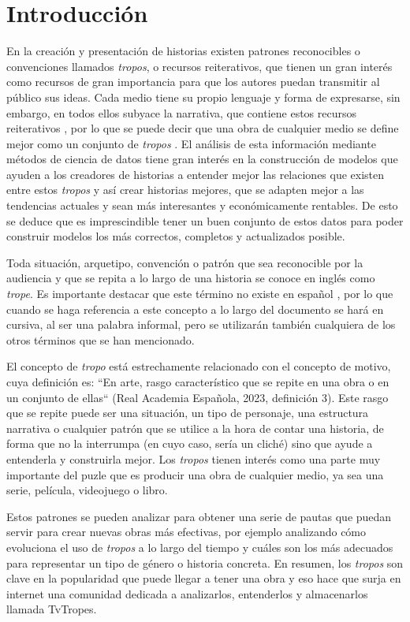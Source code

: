 \chapter{Introducción}
En la creación y presentación de historias existen patrones reconocibles o
convenciones llamados \textit{tropos}, o recursos reiterativos, que tienen un
gran interés como recursos de gran importancia para que los autores puedan
transmitir al público sus ideas. Cada medio tiene su propio lenguaje y forma de
expresarse, sin embargo, en todos ellos subyace la narrativa, que contiene estos
recursos reiterativos \cite{garcia2021simpsons}, por lo que se puede decir que
una obra de cualquier medio se define mejor como un conjunto de \textit{tropos}
\cite{garcia2020tropes}. El análisis de esta información mediante métodos de
ciencia de datos tiene gran interés en la construcción de modelos que ayuden a
los creadores de historias a entender mejor las relaciones que existen entre
estos \textit{tropos} y así crear historias mejores, que se adapten mejor a las
tendencias actuales y sean más interesantes y económicamente rentables. De esto
se deduce que es imprescindible tener un buen conjunto de estos datos para poder
construir modelos los más correctos, completos y actualizados posible.

Toda situación, arquetipo, convención o patrón que sea reconocible por la
audiencia y que se repita a lo largo de una historia se conoce en inglés como
\textit{trope}. Es importante destacar que este término no existe en español
\cite{tesisruben}, por lo que cuando se haga referencia a este concepto a lo
largo del documento se hará en cursiva, al ser una palabra informal, pero se
utilizarán también cualquiera de los otros términos que se han mencionado.

El concepto de \textit{tropo} está estrechamente relacionado con el concepto de
motivo, cuya definición es: ``En arte, rasgo característico que se repite en una
obra o en un conjunto de ellas`` (Real Academia Española, 2023, definición 3).
Este rasgo que se repite puede ser una situación, un tipo de personaje, una
estructura narrativa o cualquier patrón que se utilice a la hora de contar una
historia, de forma que no la interrumpa (en cuyo caso, sería un cliché) sino que
ayude a entenderla y construirla mejor. Los \textit{tropos} tienen interés como
una parte muy importante del puzle que es producir una obra de cualquier medio,
ya sea una serie, película, videojuego o libro. 

Estos patrones se pueden analizar para obtener una serie de pautas que puedan
servir para crear nuevas obras más efectivas, por ejemplo analizando cómo
evoluciona el uso de \textit{tropos} a lo largo del tiempo y cuáles son los más
adecuados para representar un tipo de género o historia concreta. En resumen,
los \textit{tropos} son clave en la popularidad que puede llegar a tener una
obra y eso hace que surja en internet una comunidad dedicada a analizarlos,
entenderlos y almacenarlos llamada TvTropes. 

